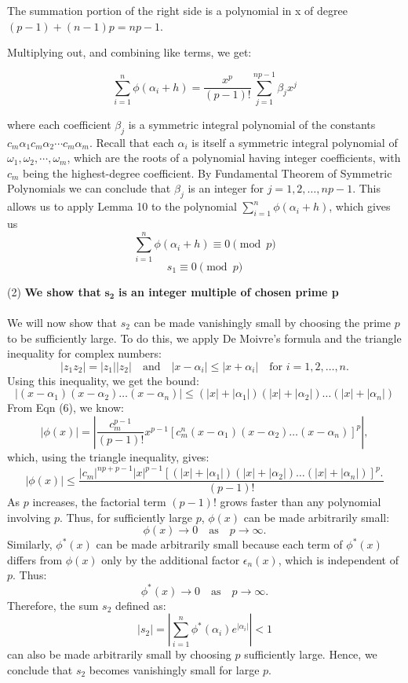 \documentclass{article}
\begin{document}
The summation portion of the right side is a polynomial in x of degree $(p-1) + (n-1)p = np - 1$.

Multiplying out, and combining like terms, we get:

\[ \sum_{i = 1}^{n} \phi(\alpha_i + h) = \frac{x^p}{(p-1)!}\sum_{j = 1}^{np-1} \beta_jx^j \]

where each coefficient $\beta_j$ is a symmetric integral polynomial of the constants $c_m\alpha_1 c_m\alpha_2 \cdots c_m\alpha_m$. Recall
that each $\alpha_i$ is itself a symmetric integral polynomial of $\omega_1, \omega_2,\cdots,\omega_m$, which are the roots of a polynomial
having integer coefficients, with $c_m$ being the highest-degree coefficient. By Fundamental Theorem of Symmetric Polynomials we can conclude that
$\beta_j$ is an integer for $j = 1, 2, \ldots, np - 1$. This allows us to apply
Lemma 10 to the polynomial $\sum_{i = 1}^{n} \phi(\alpha_i + h)$, which gives us
\[ \sum_{i = 1}^{n} \phi(\alpha_i + h) \equiv 0 \pmod{p} \]
\[s_1 \equiv 0 \pmod{p} \tag{9} \]

(2) \textbf{We show that }$\mathbf{s_2}$ \textbf{is an integer multiple of chosen prime p}\\\\
We will now show that $s_2$ can be made vanishingly small by choosing the prime $p$ to be sufficiently large. To do this, we apply De Moivre's formula and the triangle inequality for complex numbers:
\[
|z_1 z_2| = |z_1| |z_2| \quad \text{and} \quad |x - \alpha_i| \leq |x + \alpha_i| \quad \text{for } i = 1, 2, \dots, n.
\]
Using this inequality, we get the bound:
\[
|(x - \alpha_1)(x - \alpha_2) \dots (x - \alpha_n)| \leq (|x| + |\alpha_1|)(|x| + |\alpha_2|) \dots (|x| + |\alpha_n|)
\]
From Eqn (6), we know:
\[
|\phi(x)| = |\frac{c_m^{p-1}}{(p-1)!} x^{p-1} \left[ c_m^n (x - \alpha_1)(x - \alpha_2) \dots (x - \alpha_n) \right]^p|,
\]
which, using the triangle inequality, gives:
\[
|\phi(x)| \leq \frac{|c_m|^{np + p - 1} |x|^{p-1} [(|x| + |\alpha_1|)(|x| + |\alpha_2|) \dots (|x| + |\alpha_n|)]^p.}{(p-1)!}
\]
As $p$ increases, the factorial term $(p-1)!$ grows faster than any polynomial involving $p$. Thus, for sufficiently large $p$, $\phi(x)$ can be made arbitrarily small:
\[
\phi(x) \to 0 \quad \text{as} \quad p \to \infty.
\]
Similarly, $\phi^*(x)$ can be made arbitrarily small because each term of $\phi^*(x)$ differs from $\phi(x)$ only by the additional factor $\epsilon_n(x)$, which is independent of $p$. Thus:
\[
\phi^*(x) \to 0 \quad \text{as} \quad p \to \infty.
\]
Therefore, the sum $s_2$ defined as:
\[
|s_2| = |\sum_{i=1}^{n} \phi^*(\alpha_i)e^{|\alpha_i|}| < 1 \tag{10}
\]
can also be made arbitrarily small by choosing $p$ sufficiently large. Hence, we conclude that $s_2$ becomes vanishingly small for large $p$.\\
\end{document}
